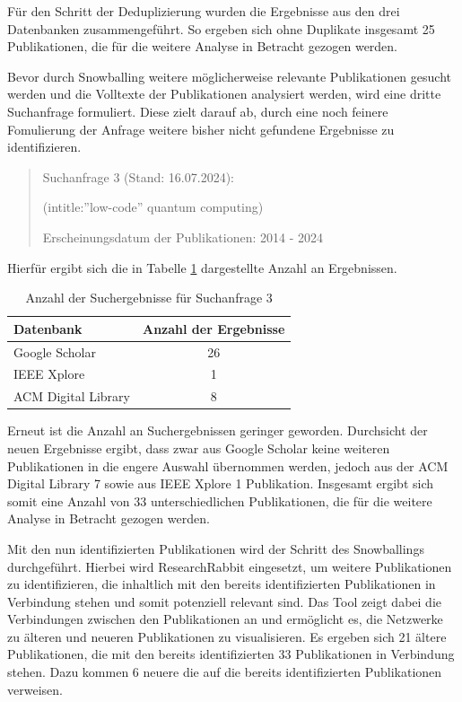 Für den Schritt der Deduplizierung wurden die Ergebnisse aus den drei Datenbanken zusammengeführt. 
So ergeben sich ohne Duplikate insgesamt 25 Publikationen, die für die weitere Analyse in Betracht gezogen werden. 

Bevor durch Snowballing weitere möglicherweise relevante Publikationen gesucht werden und die Volltexte der Publikationen analysiert werden, 
wird eine dritte Suchanfrage formuliert. Diese zielt darauf ab, durch eine noch feinere Fomulierung der Anfrage weitere bisher nicht gefundene 
Ergebnisse zu identifizieren. 

\begin{quote}
    Suchanfrage 3 (Stand: 16.07.2024):

    (intitle:''low-code'' quantum computing)

    Erscheinungsdatum der Publikationen: 2014 - 2024
\end{quote}

Hierfür ergibt sich die in Tabelle \ref{tab:search_3_results} dargestellte Anzahl an Ergebnissen. 

\begin{table}[h!]
    \centering
    \caption{Anzahl der Suchergebnisse für Suchanfrage 3}
    \label{tab:search_3_results}
    \begin{tabular}{|l|c|}
    \hline
    \textbf{Datenbank} & \textbf{Anzahl der Ergebnisse} \\ \hline
    Google Scholar & 26 \\ \hline
    IEEE Xplore & 1 \\ \hline
    ACM Digital Library & 8 \\ \hline
    \end{tabular}
\end{table}

Erneut ist die Anzahl an Suchergebnissen geringer geworden. Durchsicht der neuen Ergebnisse ergibt, dass zwar aus Google Scholar 
keine weiteren Publikationen in die engere Auswahl übernommen werden, jedoch aus der ACM Digital Library 7 sowie aus IEEE Xplore 1 Publikation. 
Insgesamt ergibt sich somit eine Anzahl von 33 unterschiedlichen Publikationen, die für die weitere Analyse in Betracht gezogen werden. 

Mit den nun identifizierten Publikationen wird der Schritt des Snowballings durchgeführt. Hierbei wird ResearchRabbit eingesetzt, um 
weitere Publikationen zu identifizieren, die inhaltlich mit den bereits identifizierten Publikationen in Verbindung stehen und somit 
potenziell relevant sind. Das Tool zeigt dabei die Verbindungen zwischen den Publikationen an und ermöglicht es, die Netzwerke 
zu älteren und neueren Publikationen zu visualisieren. Es ergeben sich 21 ältere Publikationen, die mit den bereits identifizierten 33 
Publikationen in Verbindung stehen. Dazu kommen 6 neuere die auf die bereits identifizierten Publikationen verweisen. 

